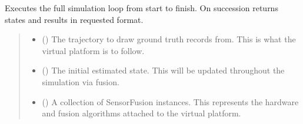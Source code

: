 \documentclass[letterpaper,10pt,english]{sphinxmanual}
\begin{document}
\begin{fulllineitems}
\label{\detokenize{modules/simulation/results:qnav.simulation.simulation.run_simulation_loop}}
\pysigstartsignatures
{}
\pysigstopsignatures
\sphinxAtStartPar
Executes the full simulation loop from start to finish.
On succession returns states and results in requested format.
\begin{quote}\begin{description}
\begin{itemize}
\item {} 
\sphinxAtStartPar
{} ({\hyperref[\detokenize{modules/waypoints/trajectory:qnav.waypoints.trajectory.Trajectory}]{}}) \textendash{} The trajectory to draw ground truth records from.
This is what the virtual platform is to follow.

\item {} 
\sphinxAtStartPar
{} ({\hyperref[\detokenize{modules/estimation/state:qnav.estimation.state.EstimatedState}]{}}) \textendash{} The initial estimated state. This will be
updated throughout the simulation via fusion.

\item {} 
\sphinxAtStartPar
{} (\sphinxstyleliteralemphasis{\sphinxupquote{{[}}}{\hyperref[\detokenize{modules/measurement/sensor:qnav.measurement.sensor.SensorFusion}]{\sphinxcrossref{\sphinxstyleliteralemphasis{\sphinxupquote{SensorFusion}}}}}\sphinxstyleliteralemphasis{\sphinxupquote{{]}}}) \textendash{} A collection of SensorFusion instances. This represents
the hardware and fusion algorithms attached to the virtual platform.


\end{itemize}
\end{description}
\end{quote}
\end{fulllineitems}
\end{document}
